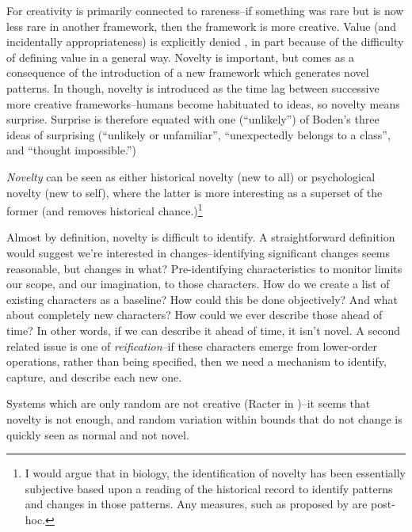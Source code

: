 \begin{mdframed}[style=box, frametitle={Creativity, and its relationship to Novelty, Surprise, and Value}]
For \textcite{Dorin2009} creativity is primarily connected to rareness--if something was rare but is now less rare in another framework, then the framework is more creative. Value (and incidentally appropriateness) is explicitly denied \parencite[p.18]{Dorin2009}, in part because of the difficulty of defining value in a general way. Novelty is important, but comes as a consequence of the introduction of a new framework which generates novel patterns. In \textcite[p.16]{Dorin2009} though, novelty is introduced as the time lag between successive more creative frameworks--humans become habituated to ideas, so novelty means surprise. Surprise is therefore equated with one (``unlikely'') of Boden's three ideas of surprising (``unlikely or unfamiliar'', ``unexpectedly belongs to a class'', and ``thought impossible.'')

\emph{Novelty} can be seen as either historical novelty (new to all) or psychological novelty (new to self), where the latter is more interesting as a superset of the former (and removes historical chance.)\footnote{I would argue that in biology, the identification of novelty has been essentially subjective based upon a reading of the historical record to identify patterns and changes in those patterns. Any measures, such as proposed by \textcite{McShea1998,Maynard-Smith:1995lw,Walker2012} are post-hoc.}

Almost by definition, novelty is difficult to identify. A straightforward definition would suggest we're interested in changes--identifying significant changes seems reasonable, but changes in what? Pre-identifying characteristics to monitor limits our scope, and our imagination, to those characters. How do we create a list of existing characters as a baseline? How could this be done objectively? And what about completely new characters? How could we ever describe those ahead of time? In other words, if we can describe it ahead of time, it isn't novel. A second related issue is one of \textit{reification}--if these characters emerge from lower-order operations, rather than being specified, then we need a mechanism to identify, capture, and describe each new one.

Systems which are only random are not creative (\eg Racter in \textcite[p.16]{Dorin2009})--it seems that novelty is not enough, and random variation within bounds that do not change is quickly seen as normal and not novel. 


\end{mdframed}
